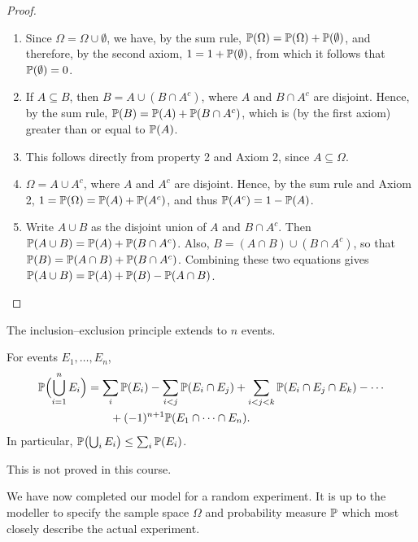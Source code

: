 \begin{proof}\leavevmode
\begin{enumerate}[leftmargin=*]
  \item[1.] Since $\Omega = \Omega \cup \emptyset$, we have, by the sum rule, $\mathbb{P}(\Omega) = \mathbb{P}(\Omega) + \mathbb{P}(\emptyset)$, and therefore, by the second axiom, $1 = 1 + \mathbb{P}(\emptyset)$, from which it follows that $\mathbb{P}(\emptyset) = 0$.
  \item[2.] If $A \subseteq B$, then $B = A \cup (B \cap A^c)$, where $A$ and $B \cap A^c$ are disjoint. Hence, by the sum rule, $\mathbb{P}(B) = \mathbb{P}(A) + \mathbb{P}(B \cap A^c)$, which is (by the first axiom) greater than or equal to $\mathbb{P}(A)$.
  \item[3.] This follows directly from property 2 and Axiom 2, since $A \subseteq \Omega$.
  \item[4.] $\Omega = A \cup A^c$, where $A$ and $A^c$ are disjoint. Hence, by the sum rule and Axiom 2, $1 = \mathbb{P}(\Omega) = \mathbb{P}(A) + \mathbb{P}(A^c)$, and thus $\mathbb{P}(A^c) = 1 - \mathbb{P}(A)$.
  \item[5.] Write $A \cup B$ as the disjoint union of $A$ and $B \cap A^c$. Then $\mathbb{P}(A \cup B) = \mathbb{P}(A) + \mathbb{P}(B \cap A^c)$. Also, $B = (A \cap B) \cup (B \cap A^c)$, so that $\mathbb{P}(B) = \mathbb{P}(A \cap B) + \mathbb{P}(B \cap A^c)$. Combining these two equations gives $\mathbb{P}(A \cup B) = \mathbb{P}(A) + \mathbb{P}(B) - \mathbb{P}(A \cap B)$. \qedhere
\end{enumerate}
\end{proof}

The inclusion--exclusion principle extends to $n$ events.

\begin{theorem}\label{thm:inclusion-exclusion}
For events $E_1, \ldots, E_n$,
\begin{align*}
  \mathbb{P}\Bigl(\bigcup_{i=1}^n E_i\Bigr) &= \sum_i \mathbb{P}(E_i) - \sum_{i<j} \mathbb{P}(E_i \cap E_j) + \sum_{i<j<k} \mathbb{P}(E_i \cap E_j \cap E_k) - \cdots \\
  &\qquad + (-1)^{n+1} \mathbb{P}(E_1 \cap \cdots \cap E_n).
\end{align*}
In particular, $\mathbb{P}\bigl(\bigcup_i E_i\bigr) \le \sum_i \mathbb{P}(E_i)$.
\end{theorem}

This is not proved in this course.

We have now completed our model for a random experiment. It is up to the modeller to specify the sample space $\Omega$ and probability measure $\mathbb{P}$ which most closely describe the actual experiment.

